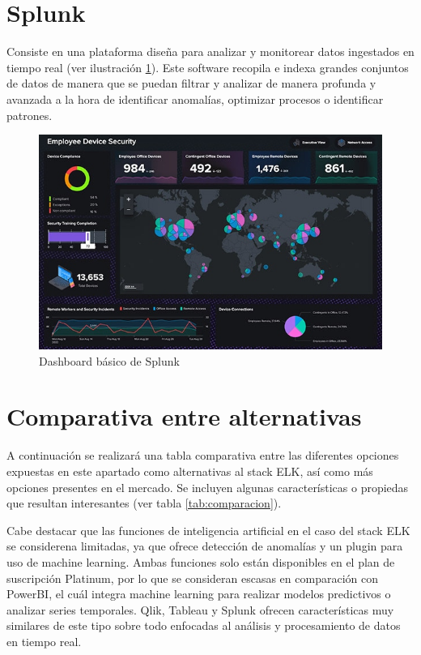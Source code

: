 \section{Splunk}
Consiste en una plataforma diseña para analizar y monitorear datos ingestados en tiempo real  (ver ilustración  \ref{fig:splunk}). Este software recopila e indexa grandes conjuntos de datos de manera que se puedan filtrar y analizar de manera profunda y avanzada a la hora de identificar anomalías, optimizar procesos o identificar patrones.

\begin{figure}
    \centering
    \includegraphics[width=1\linewidth]{img/splunk.jpg}
    \caption{Dashboard básico de Splunk \cite{splunk}}
    \label{fig:splunk}
\end{figure}

\section{Comparativa entre alternativas}

A continuación se realizará una tabla comparativa entre las diferentes opciones expuestas en este apartado como alternativas al stack ELK, así como más opciones presentes en el mercado. Se incluyen algunas características o propiedas que resultan interesantes  (ver tabla \ref{tab:comparacion}).

Cabe destacar que las funciones de inteligencia artificial en el caso del stack ELK se considerena limitadas, ya que ofrece detección de anomalías y un plugin para uso de machine learning. Ambas funciones solo están disponibles en el plan de suscripción Platinum, por lo que se consideran escasas en comparación con PowerBI, el cuál integra machine learning para realizar modelos predictivos o analizar series temporales. Qlik, Tableau y Splunk ofrecen características muy similares de este tipo sobre todo enfocadas al análisis y procesamiento de datos en tiempo real.

